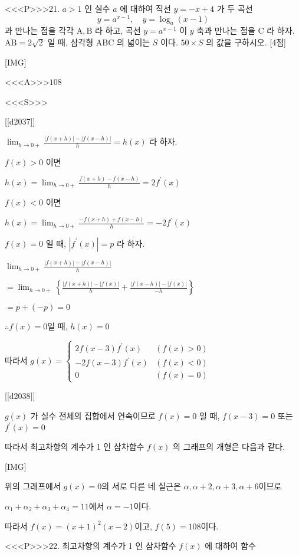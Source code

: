 \documentclass{oblivoir}
\begin{document}
<<<P>>>21. $a>1$ 인 실수 $a$ 에 대하여 직선 $y=-x+4$ 가 두 곡선
$$
y=a^{x-1}, \quad y=\log _{a}(x-1)
$$
과 만나는 점을 각각 $\mathrm{A}, \mathrm{B}$ 라 하고, 곡선 $y=a^{x-1}$ 이 $y$ 축과 만나는 점을 $\mathrm{C}$ 라 하자. $\overline{\mathrm{AB}}=2 \sqrt{2}$ 일 때, 삼각형 $\mathrm{ABC}$ 의 넓이는 $S$ 이다. $50 \times S$ 의 값을 구하시오. [4점]

[IMG]

<<<A>>>$108$

<<<S>>>

[[d2037]]

$ \lim _{h \rightarrow 0+} \frac{|f(x+h)|-|f(x-h)|}{h}=h(x)$ 라 하자.

$f(x)>0$ 이면

$h(x)=\lim _{h \rightarrow 0+} \frac{f(x+h)-f(x-h)}{h}=2 f^{\prime}(x)$

$f(x)<0 $ 이면

$h(x)=\lim _{h \rightarrow 0+} \frac{-f(x+h)+f(x-h)}{h}=-2 f^{\prime}(x)$

$f(x)=0 $ 일 때, $\left|f^{\prime}(x)\right|=p $ 라 하자.

$\lim _{h \rightarrow 0+} \frac{|f(x+h)|-|f(x-h)|}{h}$

$=\lim _{h \rightarrow 0+}\left\{\frac{|f(x+h)|-|f(x)|}{h} + \frac{|f(x-h)|-|f(x)|}{-h}\right\}$

$=p+(-p)=0$

$\therefore f(x)=0$일 때, $h(x)=0$

따라서 $g(x)=\begin{cases}
2 f(x-3) f^{\prime}(x) & (f(x)>0) \\
-2 f(x-3) f^{\prime}(x) & (f(x)<0) \\
0 & (f(x)=0)
\end{cases}$

[[d2038]]

$g(x)$ 가 실수 전체의 집합에서 연속이므로
$f(x)=0$ 일 때, $f(x-3)=0$ 또는 $f^{\prime}(x)=0$

따라서 최고차항의 계수가 1 인 삼차함수 $f(x)$ 의 그래프의 개형은 다음과 같다.

[IMG]

위의 그래프에서 $g(x)=0$의 서로 다른 네 실근은 $\alpha, \alpha+2, \alpha+3, \alpha+6$이므로

$\alpha_{1}+\alpha_{2}+\alpha_{3}+\alpha_{4}=11$에서 $\alpha=-1$이다.

따라서 $f(x)=(x+1)^2 (x-2)$이고, $f(5)=108$이다.

<<<P>>>22. 최고차항의 계수가 1 인 삼차함수 $f(x)$ 에 대하여 함수
\end{document}
